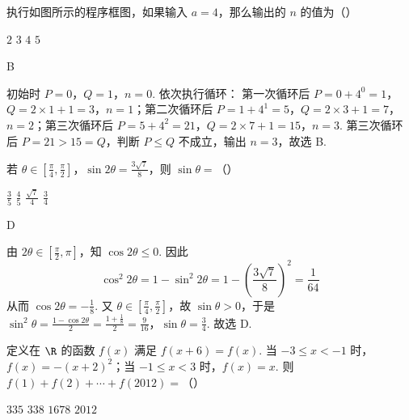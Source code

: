 \begin{problem}
执行如图所示的程序框图，如果输入 \(a = 4\)，那么输出的 \(n\) 的值为（\quad）


\choices
    {\(2\)}
    {\(3\)}
    {\(4\)}
    {\(5\)}
\end{problem}

\begin{answer}
B
\end{answer}

\begin{solution}
初始时 \(P=0\)，\(Q=1\)，\(n=0\). 依次执行循环：
第一次循环后 \(P=0+4^0=1\)，\(Q=2\times1+1=3\)，\(n=1\)；第二次循环后 \(P=1+4^1=5\)，\(Q=2\times3+1=7\)，\(n=2\)；第三次循环后 \(P=5+4^2=21\)，\(Q=2\times7+1=15\)，\(n=3\).
第三次循环后 \(P=21>15=Q\)，判断 \(P\leqslant Q\) 不成立，输出 \(n=3\)，故选 B.
\end{solution}

\begin{problem}
若 \(\theta \in \left[\frac{\pi}{4}, \frac{\pi}{2}\right]\)，\(\sin 2\theta = \frac{3\sqrt{7}}{8}\)，则 \(\sin \theta =\)（\quad）

\choices
    {\(\frac{3}{5}\)}
    {\(\frac{4}{5}\)}
    {\(\frac{\sqrt{7}}{4}\)}
    {\(\frac{3}{4}\)}
\end{problem}

\begin{answer}
D
\end{answer}

\begin{solution}
由 \(2\theta\in\left[\frac{\pi}{2},\pi\right]\)，知 \(\cos2\theta\leqslant0\). 因此
\[
\cos^2 2\theta=1-\sin^2 2\theta
=1-\left(\frac{3\sqrt7}{8}\right)^2
=\frac1{64}
\]
从而 \(\cos2\theta=-\frac18\). 又 \(\theta\in\left[\frac{\pi}{4},\frac{\pi}{2}\right]\)，故 \(\sin\theta>0\)，于是
\(\sin^2\theta=\frac{1-\cos2\theta}{2} =\frac{1+\frac18}{2} =\frac9{16}\)，\(\sin\theta=\frac34\).
故选 D.
\end{solution}

\begin{problem}
定义在 \(\R\) 的函数 \(f(x)\) 满足 \(f(x + 6) = f(x)\). 当 \(-3 \leqslant x < -1\) 时，\(f(x) = -(x + 2)^2\)；当 \(-1 \leqslant x < 3\) 时，\(f(x) = x\). 则 \(f(1) + f(2) + \cdots + f(2012) =\)（\quad）

\choices
    {\(335\)}
    {\(338\)}
    {\(1678\)}
    {\(2012\)}
\end{problem}

